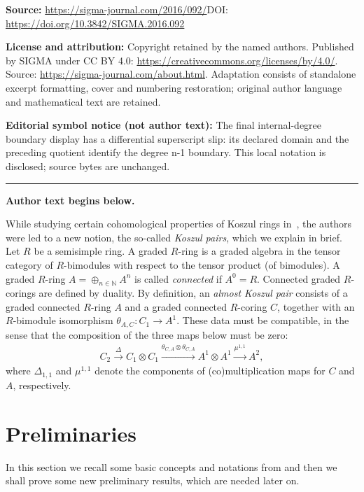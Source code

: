\documentclass[11pt]{article}
\newcommand\ot{\otimes}
\newcommand\op{\oplus}
\newcommand\bb{\mathbb}
\renewcommand{\^}[1]{\mbox{$^{\left( #1 \right)}$}}
\renewcommand{\_}[1]{\mbox{$_{\left( #1 \right)}$}}
\newcommand\xrar{\xrightarrow}
\numberwithin{equation}{section}
\begin{document}
\noindent\textbf{Source:} \url{https://sigma-journal.com/2016/092/}\quad DOI: \url{https://doi.org/10.3842/SIGMA.2016.092}\par
\noindent\textbf{License and attribution:} Copyright retained by the named authors. Published by SIGMA under CC BY 4.0: \url{https://creativecommons.org/licenses/by/4.0/}. Source: \url{https://sigma-journal.com/about.html}. Adaptation consists of standalone excerpt formatting, cover and numbering restoration; original author language and mathematical text are retained.\par
\noindent\textbf{Editorial symbol notice (not author text):} The final internal-degree boundary display has a differential superscript slip: its declared domain and the preceding quotient identify the degree n-1 boundary. This local notation is disclosed; source bytes are unchanged.\par
\medskip\hrule\medskip\noindent\textbf{Author text begins below.}\par
\setcounter{section}{1}
\setcounter{subsection}{0}
\setcounter{subsubsection}{0}
\setcounter{Theorem}{0}
\setcounter{equation}{0}
While studying certain cohomological properties of Koszul rings in~\cite{jps}, the authors were led to a new notion, the so-called \emph{Koszul pairs}, which we explain in brief. Let $R$ be a semisimple ring. A graded $R$-ring is a graded algebra in the tensor category of $R$-bimodules with respect to the tensor product (of bimodules). A graded $R$-ring $A = \op_{n \in \bb{N}} A^n$ is called \emph{connected} if $A^0 = R$. Connected graded $R$-corings are def\/ined by duality. By def\/inition, an \emph{almost Koszul pair} consists of a graded connected $R$-ring $A$ and a graded connected $R$-coring $C$, together with an $R$-bimodule isomorphism $\theta_{A,C}\colon C_1 \to A^1$. These data must be compatible, in the sense that the composition of the three maps below must be zero:
\begin{gather}\label{ec:theta}
C_2 \xrar{\Delta} C_1 \ot C_1 \xrar{\theta_{C,A} \ot \theta_{C,A}} A^1 \ot A^1 \xrar{\mu^{1,1}} A^2,	
\end{gather}
where $\Delta_{1,1}$ and $\mu^{1,1}$ denote the components of (co)multiplication maps for $C$ and $A$, respectively.
\setcounter{section}{1}
\setcounter{subsection}{0}
\setcounter{subsubsection}{0}
\setcounter{Theorem}{0}
\setcounter{equation}{1}
\section{Preliminaries}\label{section2}
In this section we recall some basic concepts and notations from \cite{jps} and then we shall prove some new preliminary results, which are needed later on.
	
\end{document}
